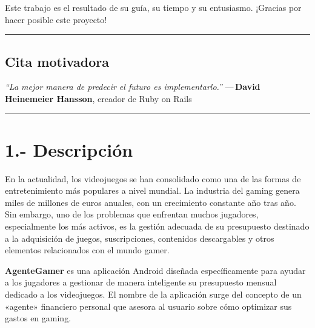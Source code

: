 \documentclass[
  spanish,
  11pt,
  paper=a4,
  ,captions=tableheading
]{scrartcl}
\renewenvironment{quote}{\begin{customblockquote}\list{}{\rightmargin=0em\leftmargin=0em}%
\item\relax\color{blockquote-text}\ignorespaces}{\unskip\unskip\endlist\end{customblockquote}}
\begin{document}
Este trabajo es el resultado de su guía, su tiempo y su entusiasmo.
¡Gracias por hacer posible este proyecto!

\begin{center}\rule{0.5\linewidth}{0.5pt}\end{center}

\hypertarget{cita-motivadora}{%
\subsection{Cita motivadora}\label{cita-motivadora}}

\begin{quote}
\emph{``La mejor manera de predecir el futuro es implementarlo.''}
---\,\textbf{David Heinemeier Hansson}, creador de Ruby on Rails
\end{quote}

\usepackage{xcolor}
  \usepackage{sectsty}
  \allsectionsfont{\color{headingblue}}
  \usepackage{hyperref}
  \usepackage{pdflscape}
  \usepackage{graphicx}
  \usepackage{float}
  \usepackage{placeins}
  \let\origfigure\figure
  \let\endorigfigure\endfigure
  \renewenvironment{figure}[1][2]{\origfigure[H]}{\endorigfigure}
  \hypersetup{
    colorlinks=true,
    linkcolor=headingblue,
    urlcolor=headingblue,
    citecolor=headingblue
  }

\begin{center}\rule{0.5\linewidth}{0.5pt}\end{center}

\newpage

\hypertarget{descripciuxf3n}{%
\section{1.- Descripción}\label{descripciuxf3n}}

En la actualidad, los videojuegos se han consolidado como una de las
formas de entretenimiento más populares a nivel mundial. La industria
del gaming genera miles de millones de euros anuales, con un crecimiento
constante año tras año. Sin embargo, uno de los problemas que enfrentan
muchos jugadores, especialmente los más activos, es la gestión adecuada
de su presupuesto destinado a la adquisición de juegos, suscripciones,
contenidos descargables y otros elementos relacionados con el mundo
gamer.

\textbf{AgenteGamer} es una aplicación Android diseñada específicamente
para ayudar a los jugadores a gestionar de manera inteligente su
presupuesto mensual dedicado a los videojuegos. El nombre de la
aplicación surge del concepto de un «agente» financiero personal que
asesora al usuario sobre cómo optimizar sus gastos en gaming.
\end{document}
